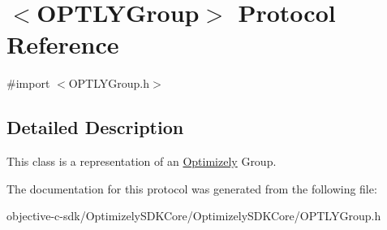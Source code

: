 \hypertarget{protocol_o_p_t_l_y_group-p}{}\section{$<$O\+P\+T\+L\+Y\+Group$>$ Protocol Reference}
\label{protocol_o_p_t_l_y_group-p}


{\ttfamily \#import $<$O\+P\+T\+L\+Y\+Group.\+h$>$}



\subsection{Detailed Description}
This class is a representation of an \mbox{\hyperlink{interface_optimizely}{Optimizely}} Group. 

The documentation for this protocol was generated from the following file\+:\begin{DoxyCompactItemize}
\item 
objective-\/c-\/sdk/\+Optimizely\+S\+D\+K\+Core/\+Optimizely\+S\+D\+K\+Core/O\+P\+T\+L\+Y\+Group.\+h\end{DoxyCompactItemize}
